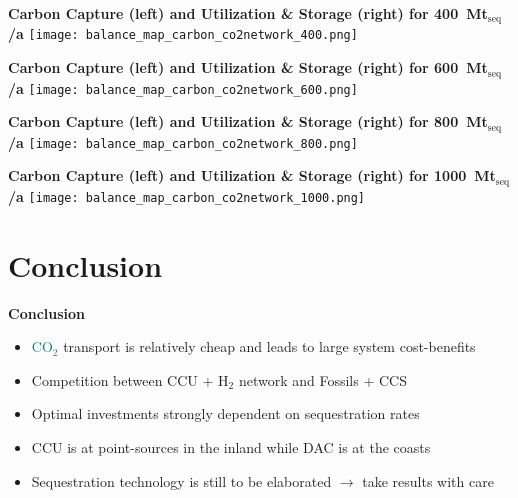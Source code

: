 \documentclass[12pt, aspectratio=169]{beamer}
\newcommand{\carbon}{\textcolor{teal}{CO$_2$}}
\newcommand{\hydrogen}{H$_2$}
\begin{document}
\begin{frame}
    \textbf{Carbon Capture (left) and Utilization \& Storage (right) for 400~Mt$_{\text{seq}}$/a}
    \texttt{[image: balance\_map\_carbon\_co2network\_400.png]}
\end{frame}

\begin{frame}
    \textbf{Carbon Capture (left) and Utilization \& Storage (right) for 600~Mt$_{\text{seq}}$/a}
    \texttt{[image: balance\_map\_carbon\_co2network\_600.png]}
\end{frame}

\begin{frame}
    \textbf{Carbon Capture (left) and Utilization \& Storage (right) for 800~Mt$_{\text{seq}}$/a}
    \texttt{[image: balance\_map\_carbon\_co2network\_800.png]}
\end{frame}

\begin{frame}
    \textbf{Carbon Capture (left) and Utilization \& Storage (right) for 1000~Mt$_{\text{seq}}$/a}
    \texttt{[image: balance\_map\_carbon\_co2network\_1000.png]}
\end{frame}


\section*{Conclusion}

\begin{frame}
    \textbf{Conclusion}
    \begin{itemize}
        \pause
        \item \carbon{} transport is relatively cheap and leads to large system cost-benefits
              \pause
        \item Competition between CCU + \hydrogen{} network and Fossils + CCS
              \pause
        \item Optimal investments strongly dependent on sequestration rates
              \pause
        \item CCU is at point-sources in the inland while DAC is at the coasts
              \pause
        \item Sequestration technology is still to be elaborated $\rightarrow$ take results with care
    \end{itemize}
\end{frame}
\end{document}
